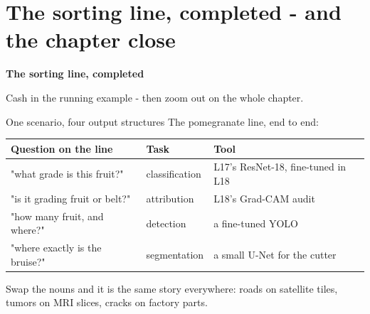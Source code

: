 \documentclass[aspectratio=169]{beamer}
\begin{document}
\section{The sorting line, completed - and the chapter close}

\begin{frame}[plain]
  \vfill
  \begin{center}
    {\Large\color{popblue}\textbf{The sorting line, completed}}\\[0.9em]
    \begin{minipage}{0.82\textwidth}\centering\small
      Cash in the running example - then zoom out on the whole chapter.
    \end{minipage}
  \end{center}
  \vfill
\end{frame}

\begin{frame}{One scenario, four output structures}
  The pomegranate line, end to end:
  \vskip 4pt
  \begin{center}\small
    \begin{tabular}{l l l}
      \textbf{Question on the line} & \textbf{Task} & \textbf{Tool}\\
      \hline
      "what grade is this fruit?" & classification & L17's ResNet-18, fine-tuned in L18\\
      "is it grading fruit or belt?" & attribution & L18's Grad-CAM audit\\
      "how many fruit, and where?" & detection & a fine-tuned YOLO\\
      "where exactly is the bruise?" & segmentation & a small U-Net for the cutter\\
    \end{tabular}
  \end{center}
  \vskip 6pt
  Swap the nouns and it is the same story everywhere: roads on satellite tiles, tumors
  on MRI slices, cracks on factory parts.
  \vskip 4pt
\end{frame}
\end{document}
